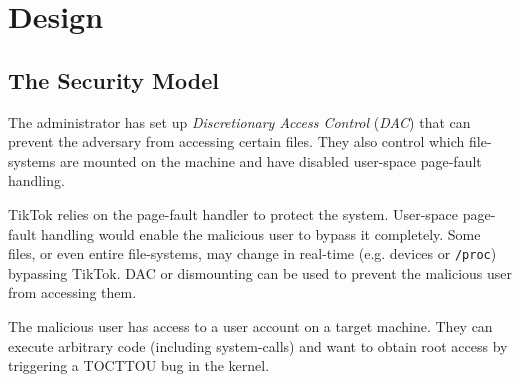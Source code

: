 \section{Design}
\label{sec:design}

\subsection{The Security Model}
\label{subsec:secmodel}


The administrator has set up \emph{Discretionary Access Control} (\emph{DAC})
that can prevent the adversary from accessing certain files. They also control
which file-systems are mounted on the machine and have disabled user-space
page-fault handling. 

TikTok relies on the page-fault handler to protect the system. User-space
page-fault handling would enable the malicious user to bypass it completely.
Some files, or even entire file-systems, may change in real-time (e.g. devices
or \texttt{/proc}) bypassing TikTok. DAC or dismounting can be used to prevent
the malicious user from accessing them.

The malicious user has access to a user account on a target machine. They can
execute arbitrary code (including system-calls) and want to obtain root access
by triggering a TOCTTOU bug in the kernel.


